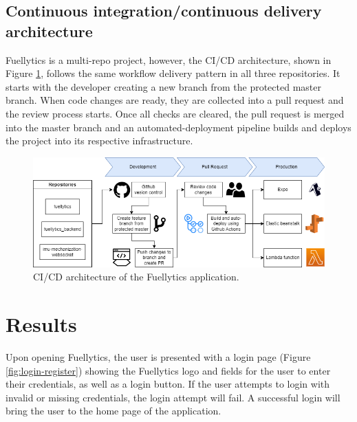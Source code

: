 \documentclass[11pt, oneside]{article}
\begin{document}
\FloatBarrier 
\subsection{Continuous integration/continuous delivery architecture}
Fuellytics is a multi-repo project, however, the CI/CD architecture, shown in Figure \ref{fig:cicd}, follows the same workflow delivery pattern in all three repositories. It starts with the developer creating a new branch from the protected master branch. When code changes are ready, they are collected into a pull request and the review process starts. Once all checks are cleared, the pull request is merged into the master branch and an automated-deployment pipeline builds and deploys the project into its respective infrastructure.

\begin{figure}[!htb]
\centerline{\includegraphics[width=15cm]{img/architecture/Fuellytics-CI_CD Workflow.png}}
\caption{\label{fig:cicd}CI/CD architecture of the Fuellytics application.}
\end{figure}

\section{Results}
Upon opening Fuellytics, the user is presented with a login page (Figure \ref{fig:login-register}) showing the Fuellytics logo and fields for the user to enter their credentials, as well as a login button. If the user attempts to login with invalid or missing credentials, the login attempt will fail.  A successful login will bring the user to the home page of the application.
\end{document}
